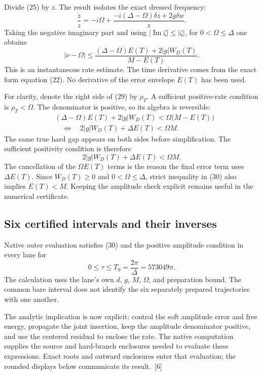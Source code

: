 \documentclass[10pt,twocolumn,letterpaper]{article}
\begin{document}
Divide (25) by $z$. The result isolates the exact dressed frequency:
\[
\frac{\dot z}{z}
=-i\Omega+
\frac{-i(\Delta-\Omega)\delta z+2g\delta w}{z}.
\]
Taking the negative imaginary part and using $|\operatorname{Im}\zeta|\le|\zeta|$, for $0<\Omega\le\Delta$ one obtains
\begin{equation}
|\nu-\Omega|\le
\frac{(\Delta-\Omega)E(T)+2|g|W_D(T)}{M-E(T)}.
\tag{29}\label{eq:clock-rate-bound}
\end{equation}
This is an instantaneous rate estimate. The time derivative comes from the exact form equation (22). No derivative of the error envelope $E(T)$ has been used.

For clarity, denote the right side of (29) by $\rho_T$. A sufficient positive-rate condition is $\rho_T<\Omega$. The denominator is positive, so its algebra is reversible:
\[
\begin{aligned}
&(\Delta-\Omega)E(T)+2|g|W_D(T)
       <\Omega\bigl(M-E(T)\bigr)\\
&\hspace{1em}\Longleftrightarrow\quad
2|g|W_D(T)+\Delta E(T)<\Omega M.
\end{aligned}
\]
The same true hard gap appears on both sides before simplification. The sufficient positivity condition is therefore
\begin{equation}
2|g|W_D(T)+\Delta E(T)<\Omega M.\tag{30}\label{eq:clock-positivity}
\end{equation}
The cancellation of the $\Omega E(T)$ terms is the reason the final error term uses $\Delta E(T)$. Since $W_D(T)\ge0$ and $0<\Omega\le\Delta$, strict inequality in (30) also implies $E(T)<M$. Keeping the amplitude check explicit remains useful in the numerical certificate.

\subsection{Six certified intervals and their inverses}
Native outer evaluation satisfies (30) and the positive amplitude condition in every lane for
\begin{equation}
0\le\tau\le T_0=\frac{2\pi}{\Delta}=573049\pi.\tag{31}\label{eq:clock-window}
\end{equation}
The calculation uses the lane's own $d$, $g$, $M$, $\Omega$, and preparation bound. The common bare interval does not identify the six separately prepared trajectories with one another.

The analytic implication is now explicit: control the soft amplitude error and free energy, propagate the joint insertion, keep the amplitude denominator positive, and use the centered residual to enclose the rate. The native computation supplies the source and hard-branch enclosures needed to evaluate these expressions. Exact roots and outward enclosures enter that evaluation; the rounded displays below communicate its result.~[6]
\end{document}
